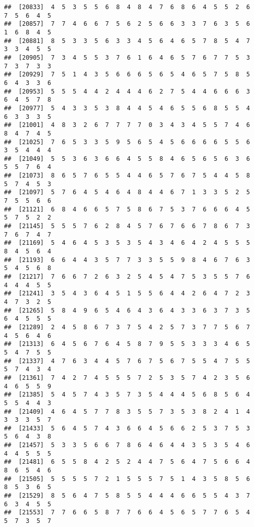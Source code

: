 \documentclass[
]{book}
\begin{document}
\begin{verbatim}
##  [20833]  4  5  3  5  5  6  8  4  8  4  7  6  8  6  4  5  5  2  6  7  5  6  4  5
##  [20857]  7  7  4  6  6  7  5  6  2  5  6  6  3  3  7  6  3  5  6  1  6  8  4  5
##  [20881]  8  5  3  3  5  6  3  3  4  5  6  4  6  5  7  8  5  4  7  3  3  4  5  5
##  [20905]  7  3  4  5  5  3  7  6  1  6  4  6  5  7  6  7  7  5  3  7  3  7  3  3
##  [20929]  7  5  1  4  3  5  6  6  6  5  6  5  4  6  5  7  5  8  5  6  4  3  3  6
##  [20953]  5  5  5  4  4  2  4  4  4  6  2  7  5  4  4  6  6  6  3  6  4  5  7  8
##  [20977]  5  4  3  3  5  3  8  4  4  5  4  6  5  5  6  8  5  5  4  6  3  3  3  5
##  [21001]  4  8  3  2  6  7  7  7  7  0  3  4  3  4  5  5  7  4  6  8  4  7  4  5
##  [21025]  7  6  5  3  3  5  9  5  6  5  4  5  6  6  6  6  5  5  6  3  5  4  4  4
##  [21049]  5  5  3  6  3  6  6  4  5  5  8  4  6  5  6  5  6  3  6  5  5  7  6  4
##  [21073]  8  6  5  7  6  5  5  4  4  6  5  7  6  7  5  4  4  5  8  5  7  4  5  3
##  [21097]  5  7  6  4  5  4  6  4  8  4  4  6  7  1  3  3  5  2  5  7  5  5  6  6
##  [21121]  6  8  4  6  6  5  7  5  8  6  7  5  3  7  6  6  6  4  5  5  7  5  2  2
##  [21145]  5  5  5  7  6  2  8  4  5  7  6  7  6  6  7  8  6  7  3  7  6  7  4  7
##  [21169]  5  4  6  4  5  3  5  3  5  4  3  4  6  4  2  4  5  5  5  8  4  5  6  4
##  [21193]  6  6  4  4  3  5  7  7  3  3  5  5  9  8  4  6  7  6  3  5  4  5  6  8
##  [21217]  7  6  6  7  2  6  3  2  5  4  5  4  7  5  3  5  5  7  6  4  4  4  5  5
##  [21241]  3  5  4  3  6  4  5  1  5  5  6  4  4  2  6  4  7  2  3  4  7  3  2  5
##  [21265]  5  8  4  9  6  5  4  6  4  3  6  4  3  3  6  3  7  3  5  6  4  5  5  5
##  [21289]  2  4  5  8  6  7  3  7  5  4  2  5  7  3  7  7  5  6  7  4  5  6  4  6
##  [21313]  6  4  5  6  7  6  4  5  8  7  9  5  5  3  3  3  4  6  5  5  4  7  5  5
##  [21337]  4  7  6  3  4  4  5  7  6  7  5  6  7  5  5  4  7  5  5  5  7  4  3  4
##  [21361]  7  4  2  7  4  5  5  5  7  2  5  3  5  7  4  2  3  5  6  4  6  5  5  9
##  [21385]  5  4  5  7  4  3  5  7  3  5  4  4  4  5  6  8  5  6  4  5  5  4  4  3
##  [21409]  4  6  4  5  7  7  8  3  5  5  7  3  5  3  8  2  4  1  4  3  3  3  5  7
##  [21433]  5  6  4  5  7  4  3  6  6  4  5  6  6  2  5  3  7  5  3  5  6  4  3  8
##  [21457]  5  3  3  5  6  6  7  8  6  4  6  4  4  3  5  3  5  4  6  4  4  5  5  5
##  [21481]  6  5  5  8  4  2  5  2  4  4  7  5  6  4  7  5  6  6  4  8  6  5  4  6
##  [21505]  5  5  5  5  7  2  1  5  5  5  7  5  1  4  3  5  8  5  6  8  5  3  6  5
##  [21529]  8  5  6  4  7  5  8  5  5  4  4  4  6  6  5  5  4  3  7  6  3  4  5  5
##  [21553]  7  7  6  6  5  8  7  7  6  6  4  5  6  5  7  7  6  5  4  5  7  3  5  7

\end{verbatim}
\end{document}
